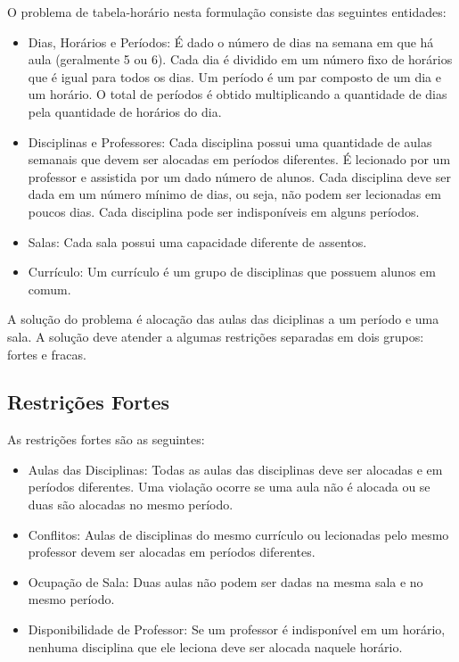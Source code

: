 \documentclass[11pt]{article}
\begin{document}
O problema de tabela-horário nesta formulação consiste das seguintes entidades:

\begin{itemize}

\item Dias, Horários e Períodos: É dado o número de dias na semana em que há aula (geralmente 5 ou 6). Cada dia é dividido em um número fixo de horários que é igual para todos os dias. Um período é um par composto de um dia e um horário. O total de períodos é obtido multiplicando a quantidade de dias pela quantidade de horários do dia.

\item Disciplinas e Professores: Cada disciplina possui uma quantidade de aulas semanais que devem ser alocadas em períodos diferentes. É lecionado por um professor e assistida por um dado número de alunos. Cada disciplina deve ser dada em um número mínimo de dias, ou seja, não podem ser lecionadas em poucos dias. Cada disciplina pode ser indisponíveis em alguns períodos.

\item Salas: Cada sala possui uma capacidade diferente de assentos.

\item Currículo: Um currículo é um grupo de disciplinas que possuem alunos em comum.

\end{itemize}

A solução do problema é alocação das aulas das diciplinas a um período e uma sala. A solução deve atender a algumas restrições separadas em dois grupos: fortes e fracas.

\subsection{Restrições Fortes}

As restrições fortes são as seguintes:

\begin{itemize}

\item Aulas das Disciplinas: Todas as aulas das disciplinas deve ser alocadas e em períodos diferentes. Uma violação ocorre se uma aula não é alocada ou se duas são alocadas no mesmo período.

\item Conflitos: Aulas de disciplinas do mesmo currículo ou lecionadas pelo mesmo professor devem ser alocadas em períodos diferentes. 

\item Ocupação de Sala: Duas aulas não podem ser dadas na mesma sala e no mesmo período.

\item Disponibilidade de Professor: Se um professor é indisponível em um horário, nenhuma disciplina que ele leciona deve ser alocada naquele horário.

\end{itemize}
\end{document}
